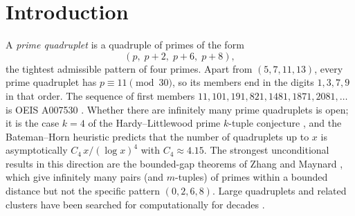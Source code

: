 \documentclass[11pt,a4paper]{article}
\begin{document}
\begin{abstract}
class, and are therefore structural, but no control reproduces the small
closed set of exceptions. We also prove, from a two-line covering lemma and computed base cases, that the chain is an
additive basis for all integers: every integer up to the next quadruplet
(indeed up to a bound that grows like the sum of all earlier members) is a
sum of distinct chain members plus one expression in $2,3,5,7$ in which,
unlike in the conjecture itself, $-$ is allowed alongside $+$ and
$\times$; this is unconditional below $10^9$ and rests beyond that
only on a mild growth condition. We explain carefully what the conjecture
does and does not say about locating the next quadruplet, give a heuristic
for why such representations are plentiful, and state open questions. We also make explicit the decimal consequences of the first-member
congruence: every first member ends in the digit $1$, and both the member
itself and its digit sum have the form $2+3n$ for nonnegative integers $n$,
properties verified for all $28{,}387$ first members below $10^9$.
The utility that builds the chain and
the full dataset are available at
\url{https://github.com/SPAlgorithm/LE}.
\end{abstract}

\section{Introduction}

A \emph{prime quadruplet} is a quadruple of primes of the form
\[
(p,\; p+2,\; p+6,\; p+8),
\]
the tightest admissible pattern of four primes. Apart from $(5,7,11,13)$,
every prime quadruplet has $p\equiv 11 \pmod{30}$, so its members end in the
digits $1,3,7,9$ in that order. The sequence of first members
$11, 101, 191, 821, 1481, 1871, 2081, \dots$ is OEIS A007530
\cite{OEIS_A007530}. Whether there are infinitely many prime quadruplets is
open; it is the case $k=4$ of the Hardy--Littlewood prime $k$-tuple
conjecture \cite{HardyLittlewood1923}, and the Bateman--Horn heuristic
\cite{BatemanHorn1962} predicts that the number of quadruplets up to $x$ is
asymptotically $C_4\, x/(\log x)^4$ with $C_4 \approx 4.15$. The strongest
unconditional results in this direction are the bounded-gap theorems of
Zhang \cite{Zhang2014} and Maynard \cite{Maynard2015}, which give
infinitely many pairs (and $m$-tuples) of primes within a bounded distance
but not the specific pattern $(0,2,6,8)$. Large quadruplets and related
clusters have been searched for computationally for decades
\cite{Forbes1999}.
\end{document}
